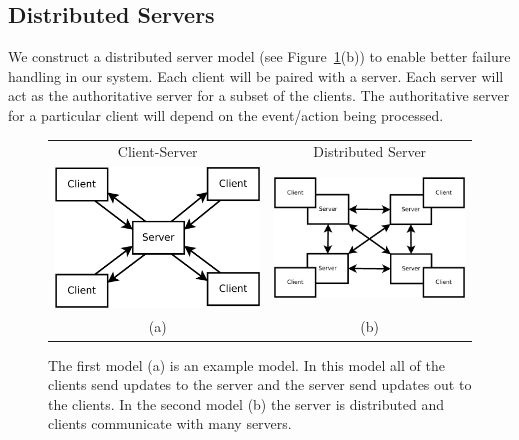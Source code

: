 	
\subsection{Distributed Servers}
\label{subsec:distributed-servers}

	We construct a distributed server model (see Figure~\ref{figure:server-models}(b)) to enable better failure handling in our system. Each client will be paired with a server. Each server will act as the authoritative server for a subset of the clients. The authoritative server for a particular client will depend on the event/action being processed. 
	
	\begin{figure}[ht]
	\centering
	\begin{tabular}{c c}
		Client-Server & Distributed Server \\
		\includegraphics[width=0.44\linewidth]{../images/client-server-model-crop.pdf} &
		\includegraphics[width=0.48\linewidth]{../images/client-distributed-server-model-crop.pdf} \\
		(a) & (b)
	\end{tabular}

	\caption{\label{figure:server-models} The first model (a) is an example \clientServer model. In this model all of the clients send updates to the server and the server send updates out to the clients. In the second model (b) the server is distributed and clients communicate with many servers.}
	\end{figure}
	
